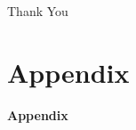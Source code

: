 \documentclass[serif, aspectratio=169]{beamer}
\begin{document}
\begin{frame}
    \begin{center}
        {\Huge\calligra Thank You}
    \end{center}
\end{frame}


\appendix  %

\section{Appendix}
\begin{frame}
    \centering
    \Huge \textbf{Appendix}
\end{frame}
\end{document}
